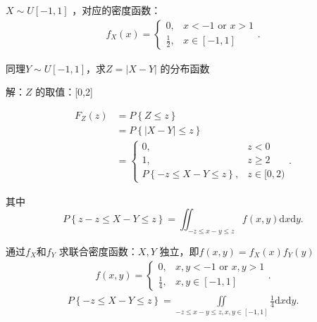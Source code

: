 \begin{eg}
    $X\sim U[-1,1]$ ，对应的密度函数：
    \begin{align*}
        f_X\left( x \right) = \begin{cases}
            0,&x< -1 \text{ or } x>1\\
            \frac{1}{2},&x\in [-1,1]
        \end{cases}
    .\end{align*}

    同理$Y\sim U[-1,1]$，求$Z=\left| X-Y \right| $ 的分布函数
\end{eg}
解：$Z$ 的取值：[0,2]

\begin{align*}
    F_Z\left( z \right) &=P\left\{ Z\le z \right\} \\
    &= P\left\{ \left| X-Y \right| \le z \right\} \\
    &= \begin{cases}
        0,&z<0\\
        1,&z\ge 2\\
     P\left\{ -z\le X-Y\le z \right\} ,&z\in [0,2)
    \end{cases}
.\end{align*}

其中\[
    P\left\{ z-z\le X-Y\le z \right\} =\iint_{-z\le x-y\le z} f\left( x,y \right) \mathrm{d}x \mathrm{d}y
.\] 

通过$f_X\text{和}f_Y$ 求联合密度函数：$X,Y$ 独立，即$f\left( x,y \right) =f_X\left( x \right) f_Y\left( y \right) $
\begin{align*}
    f\left( x,y \right) =\begin{cases}
        0,&x,y< -1 \text{ or } x,y>1\\
        \frac{1}{4},&x,y \in [-1,1]
    \end{cases}
.\end{align*}
\begin{align*}
    P\left\{ -z\le X-Y\le z \right\} =\underset{-z\le x-y\le z,x,y\in [-1,1]}{\iint} \frac{1}{4} \mathrm{d}x\mathrm{d}y
.\end{align*}

